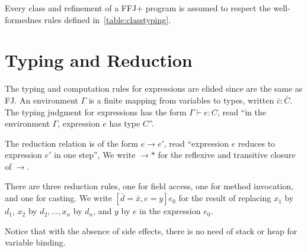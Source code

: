 Every class and refinement of a \ac{FFJ+} program is assumed to respect the well-formednes rules
defined in~\ref{table:classtyping}.

\section{Typing and Reduction}
The typing and computation rules for expressions are elided since are the same as \ac{FJ}. An environment
$\Gamma$ is a finite mapping from variables to types, written $\bar{c}:\bar{C}$.
The typing judgment for expressions has the form $\Gamma \vdash e: C$, read ``in
the environment $\Gamma$, expression $e$ has type $C$''.

The reduction relation is of the form $e \rightarrow e'$, read ``expression
$e$ reduces to expression $e'$ in one step'', We write $\rightarrow *$ for the
reflexive and transitive closure of $\rightarrow$.

There are three reduction rules, one for field access, one for method invocation, and one for casting.
We write $[\bar{d}=\bar{x}, e=y]e_0$ for
the result of replacing $x_1$ by $d_1$, $x_2$ by $d_2, \dots, x_n$ by $d_n$, and $y$ by $e$ in
the expression $e_0$.

Notice that with the absence of side effects, there is no need of stack
or heap for variable binding. 


